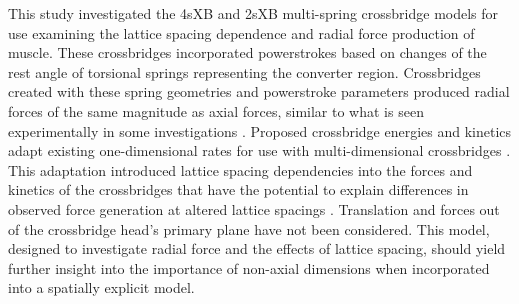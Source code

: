 \documentclass[]{article}
\begin{document}
 
 



This study investigated the 4sXB and 2sXB multi-spring crossbridge models for use examining the lattice spacing dependence and radial force production of muscle. 
These crossbridges incorporated powerstrokes based on changes of the rest angle of torsional springs representing the converter region. 
Crossbridges created with these spring geometries and powerstroke parameters produced radial forces of the same magnitude as axial forces, similar to what is seen experimentally in some investigations \citep{Cecchi1990,Brenner1991}. 
Proposed crossbridge energies and kinetics adapt existing one-dimensional rates for use with multi-dimensional crossbridges \citep{Pate1989}.
This adaptation introduced lattice spacing dependencies into the forces and kinetics of the crossbridges that have the potential to explain differences in observed force generation at altered lattice spacings  \citep{Millman1998}. 
Translation and forces out of the crossbridge head's primary plane have not been considered. %
This model, designed to investigate radial force and the effects of lattice spacing, should yield further insight into the importance of non-axial dimensions when incorporated into a spatially explicit model. 
\end{document}
